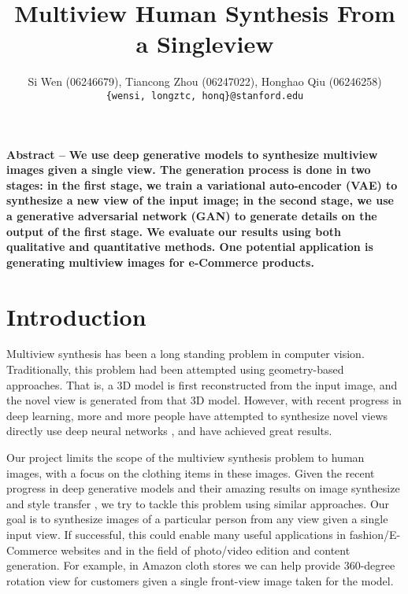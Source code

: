 \documentclass[10pt,conference]{IEEEtran}
\title{Multiview Human Synthesis From a Singleview}
\author{Si Wen (06246679), Tiancong Zhou (06247022), Honghao Qiu (06246258)\\
\texttt{\{wensi, longztc, honq\}{@}stanford.edu}}
\begin{document}
\maketitle

\newcommand{\R}{\mathbb{R}}
\newcommand{\eqnset}[1]{\left.\mbox{$#1$}\quad\quad\right\rbrace}
\newcommand{\tr}{\text{tr}\;}
\renewcommand{\th}{\theta}
\newcommand{\toi}{^{(i)}}


\textbf{Abstract --  }
\textbf{We use deep generative models to synthesize multiview images given a single view. The generation process is done in two stages: in the first stage, we train a variational auto-encoder (VAE) \autocite{kingma2013auto} to synthesize a new view of the input image; in the second stage, we use a generative adversarial network (GAN) \autocite{goodfellow2014generative} to generate details on the output of the first stage. We evaluate our results using both qualitative and quantitative methods. One potential application is generating multiview images for e-Commerce products.}


\section{Introduction} 
Multiview synthesis has been a long standing problem in computer vision. Traditionally, this problem had been attempted using geometry-based approaches. That is, a 3D model is first reconstructed from the input image, and the novel view is generated from that 3D model. However, with recent progress in deep learning, more and more people have attempted to synthesize novel views directly use deep neural networks \autocite{yim2015rotating, tatarchenko2016multi, zhao2017multi, zhou2016view, huang2017beyond, kueflerdeep, park2017transformation}, and have achieved great results.

Our project limits the scope of the multiview synthesis problem to human images, with a focus on the clothing items in these images. Given the recent progress in deep generative models and their amazing results on image synthesize and style transfer \autocite{oord2016pixel, isola2016image, zhu2017unpaired, karras2017progressive}, we try to tackle this problem using similar approaches. Our goal is to synthesize images of a particular person from any view given a single input view. If successful, this could enable many useful applications in fashion/E-Commerce websites and in the field of photo/video edition and content generation. For example, in Amazon cloth stores we can help provide 360-degree rotation view for customers given a single front-view image taken for the model.
\end{document}
